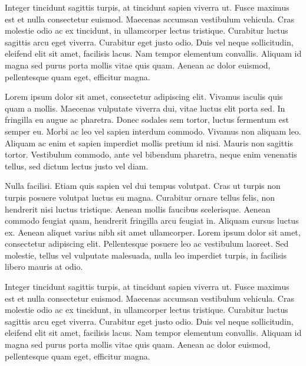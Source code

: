 Integer tincidunt sagittis turpis, at tincidunt sapien viverra ut. Fusce maximus est et nulla consectetur euismod. Maecenas accumsan vestibulum vehicula. Cras molestie odio ac ex tincidunt, in ullamcorper lectus tristique. Curabitur luctus sagittis arcu eget viverra. Curabitur eget justo odio. Duis vel neque sollicitudin, eleifend elit sit amet, facilisis lacus. Nam tempor elementum convallis. Aliquam id magna sed purus porta mollis vitae quis quam. Aenean ac dolor euismod, pellentesque quam eget, efficitur magna.\par
Lorem ipsum dolor sit amet, consectetur adipiscing elit. Vivamus iaculis quis quam a mollis. Maecenas vulputate viverra dui, vitae luctus elit porta sed. In fringilla eu augue ac pharetra. Donec sodales sem tortor, luctus fermentum est semper eu. Morbi ac leo vel sapien interdum commodo. Vivamus non aliquam leo. Aliquam ac enim et sapien imperdiet mollis pretium id nisi. Mauris non sagittis tortor. Vestibulum commodo, ante vel bibendum pharetra, neque enim venenatis tellus, sed dictum lectus justo vel diam.\par
Nulla facilisi. Etiam quis sapien vel dui tempus volutpat. Cras ut turpis non turpis posuere volutpat luctus eu magna. Curabitur ornare tellus felis, non hendrerit nisi luctus tristique. Aenean mollis faucibus scelerisque. Aenean commodo feugiat quam, hendrerit fringilla arcu feugiat in. Aliquam cursus luctus ex. Aenean aliquet varius nibh sit amet ullamcorper. Lorem ipsum dolor sit amet, consectetur adipiscing elit. Pellentesque posuere leo ac vestibulum laoreet. Sed molestie, tellus vel vulputate malesuada, nulla leo imperdiet turpis, in facilisis libero mauris at odio.\par
Integer tincidunt sagittis turpis, at tincidunt sapien viverra ut. Fusce maximus est et nulla consectetur euismod. Maecenas accumsan vestibulum vehicula. Cras molestie odio ac ex tincidunt, in ullamcorper lectus tristique. Curabitur luctus sagittis arcu eget viverra. Curabitur eget justo odio. Duis vel neque sollicitudin, eleifend elit sit amet, facilisis lacus. Nam tempor elementum convallis. Aliquam id magna sed purus porta mollis vitae quis quam. Aenean ac dolor euismod, pellentesque quam eget, efficitur magna.\par
\newpage
